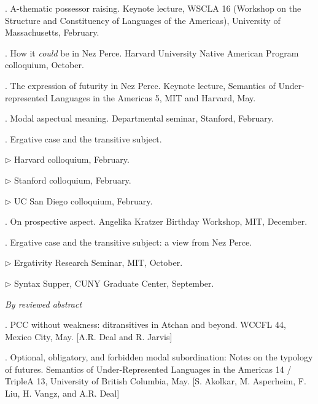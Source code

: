 \documentclass[12pt]{article}
\begin{document}
. A-thematic possessor raising. 
Keynote lecture, WSCLA 16 (Workshop on the Structure and Constituency of Languages of the Americas), University of Massachusetts, February.



.  How it \emph{could} be in Nez Perce. 
Harvard University Native American Program colloquium, October.



. The expression of futurity in Nez Perce. 
%
Keynote lecture, Semantics of Under-represented Languages in the Americas 5, MIT and Harvard, May.


. Modal aspectual meaning.
 Departmental seminar, Stanford, February.
 


 . Ergative case and the transitive subject. 

\indd $\rhd$  Harvard colloquium, February.%

\indd $\rhd$  Stanford colloquium, February.%


\indd $\rhd$  UC San Diego colloquium, February.%



. On prospective aspect. 
Angelika Kratzer Birthday Workshop, MIT, December. 




. Ergative case and the transitive subject: a view from Nez Perce. 

\indd $\rhd$   Ergativity Research Seminar, MIT, October.%


\indd $\rhd$   Syntax Supper, CUNY Graduate Center, September.%











\bigskip


\noindent\emph{By reviewed abstract \vspace{0.05in}}

. PCC without weakness: ditransitives in Atchan and beyond. WCCFL 44, Mexico City, May. [A.R. Deal and R. Jarvis]

. Optional, obligatory, and forbidden modal subordination: Notes on the typology of futures. Semantics of Under-Represented Languages in the Americas 14 / TripleA 13, University of British Columbia, May. [S. Akolkar, M. Asperheim, F. Liu, H. Vangz, and A.R. Deal]
\end{document}
